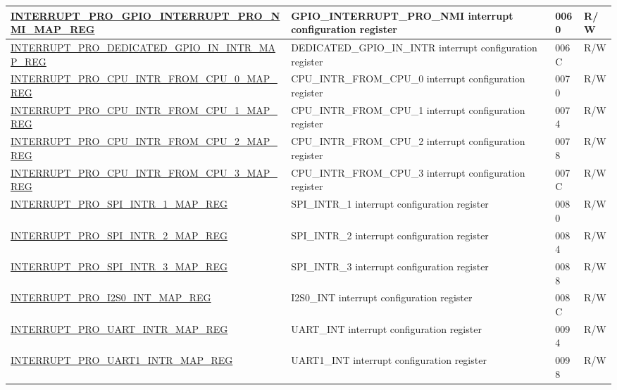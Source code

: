 \begin{longtable}{ | m{9.3cm} | m{9.2cm} | m{1.3cm} | m{1.2cm} | }
\hyperref[regdesc:INTERRUPTPROGPIOINTERRUPTPRONMIMAPREG]{INTERRUPT\_PRO\_GPIO\_INTERRUPT\_PRO\_NMI\_MAP\_REG} & GPIO\_INTERRUPT\_PRO\_NMI interrupt configuration register & \hexprefix{}0060 & R/W \\ \hline
\hyperref[regdesc:INTERRUPTPRODEDICATEDGPIOININTRMAPREG]{INTERRUPT\_PRO\_DEDICATED\_GPIO\_IN\_INTR\_MAP\_REG} & DEDICATED\_GPIO\_IN\_INTR interrupt configuration register & \hexprefix{}006C & R/W \\ \hline
\hyperref[regdesc:INTERRUPTPROCPUINTRFROMCPU0MAPREG]{INTERRUPT\_PRO\_CPU\_INTR\_FROM\_CPU\_0\_MAP\_REG} & CPU\_INTR\_FROM\_CPU\_0 interrupt configuration register & \hexprefix{}0070 & R/W \\ \hline
\hyperref[regdesc:INTERRUPTPROCPUINTRFROMCPU1MAPREG]{INTERRUPT\_PRO\_CPU\_INTR\_FROM\_CPU\_1\_MAP\_REG} & CPU\_INTR\_FROM\_CPU\_1 interrupt configuration register & \hexprefix{}0074 & R/W \\ \hline
\hyperref[regdesc:INTERRUPTPROCPUINTRFROMCPU2MAPREG]{INTERRUPT\_PRO\_CPU\_INTR\_FROM\_CPU\_2\_MAP\_REG} & CPU\_INTR\_FROM\_CPU\_2 interrupt configuration register & \hexprefix{}0078 & R/W \\ \hline
\hyperref[regdesc:INTERRUPTPROCPUINTRFROMCPU3MAPREG]{INTERRUPT\_PRO\_CPU\_INTR\_FROM\_CPU\_3\_MAP\_REG} & CPU\_INTR\_FROM\_CPU\_3 interrupt configuration register & \hexprefix{}007C & R/W \\ \hline
\hyperref[regdesc:INTERRUPTPROSPIINTR1MAPREG]{INTERRUPT\_PRO\_SPI\_INTR\_1\_MAP\_REG} & SPI\_INTR\_1 interrupt configuration register & \hexprefix{}0080 & R/W \\ \hline
\hyperref[regdesc:INTERRUPTPROSPIINTR2MAPREG]{INTERRUPT\_PRO\_SPI\_INTR\_2\_MAP\_REG} & SPI\_INTR\_2 interrupt configuration register & \hexprefix{}0084 & R/W \\ \hline
\hyperref[regdesc:INTERRUPTPROSPIINTR3MAPREG]{INTERRUPT\_PRO\_SPI\_INTR\_3\_MAP\_REG} & SPI\_INTR\_3 interrupt configuration register & \hexprefix{}0088 & R/W \\ \hline
\hyperref[regdesc:INTERRUPTPROI2S0INTMAPREG]{INTERRUPT\_PRO\_I2S0\_INT\_MAP\_REG} & I2S0\_INT interrupt configuration register & \hexprefix{}008C & R/W \\ \hline
\hyperref[regdesc:INTERRUPTPROUARTINTRMAPREG]{INTERRUPT\_PRO\_UART\_INTR\_MAP\_REG} & UART\_INT interrupt configuration register & \hexprefix{}0094 & R/W \\ \hline
\hyperref[regdesc:INTERRUPTPROUART1INTRMAPREG]{INTERRUPT\_PRO\_UART1\_INTR\_MAP\_REG} & UART1\_INT interrupt configuration register & \hexprefix{}0098 & R/W \\ \hline

\end{longtable}
